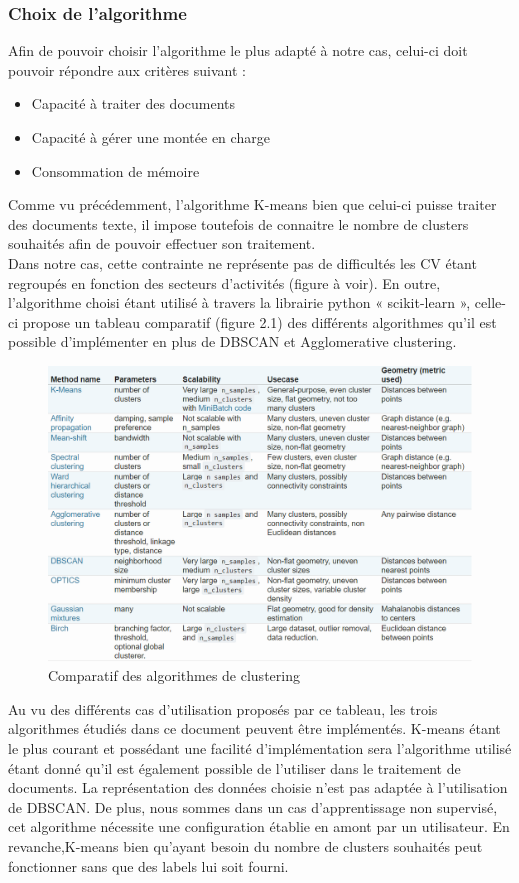 \documentclass[memoire.tex]{subfiles}
\begin{document}
\newpage
\subsubsection{Choix de l'algorithme}
Afin de pouvoir choisir l'algorithme le plus adapté à notre cas, celui-ci doit pouvoir répondre aux critères suivant : \begin{itemize}
\item Capacité à traiter des documents
\item Capacité à gérer une montée en charge
\item Consommation de mémoire 
\end{itemize}
Comme vu précédemment, l'algorithme K-means bien que celui-ci puisse traiter des documents texte, il impose toutefois de connaitre le nombre de clusters souhaités afin de pouvoir effectuer son traitement.\\
Dans notre cas, cette contrainte ne représente pas de difficultés les CV étant regroupés en fonction des secteurs d’activités (figure à voir). En outre, l’algorithme choisi étant utilisé à travers la librairie python « scikit-learn », celle-ci propose un tableau comparatif (figure 2.1)  des différents algorithmes qu’il est possible d’implémenter en plus de DBSCAN et Agglomerative clustering.
	\begin{figure}[h!]
		\centerline{\includegraphics[scale=0.6]{img/algo_table.png}}
		\caption{Comparatif des algorithmes de clustering}
	\end{figure}
Au vu des différents cas d’utilisation proposés par ce tableau, les trois algorithmes étudiés dans ce document peuvent être implémentés. K-means étant le plus courant et possédant une facilité d’implémentation sera l’algorithme utilisé étant donné qu’il est également possible de l’utiliser dans le traitement de documents. La représentation des données choisie n'est pas adaptée à l'utilisation de DBSCAN. De plus, nous sommes dans un cas d'apprentissage non supervisé, cet algorithme nécessite une configuration établie en amont par un utilisateur. En revanche,K-means bien qu'ayant besoin du nombre de clusters souhaités peut fonctionner sans que des labels lui soit fourni.
\end{document}

